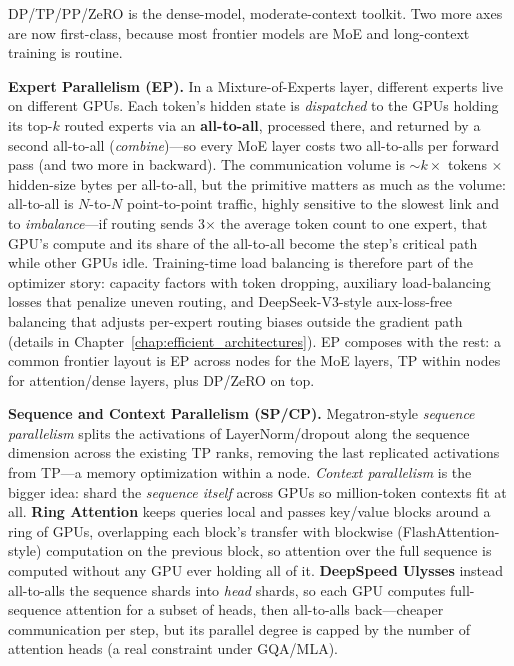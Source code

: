 DP/TP/PP/ZeRO is the dense-model, moderate-context toolkit. Two more axes are now first-class, because most frontier models are MoE and long-context training is routine.

\textbf{Expert Parallelism (EP).} In a Mixture-of-Experts layer, different experts live on different GPUs. Each token's hidden state is \emph{dispatched} to the GPUs holding its top-$k$ routed experts via an \textbf{all-to-all}, processed there, and returned by a second all-to-all (\emph{combine})---so every MoE layer costs two all-to-alls per forward pass (and two more in backward). The communication volume is $\sim k \times$ tokens $\times$ hidden-size bytes per all-to-all, but the primitive matters as much as the volume: all-to-all is $N$-to-$N$ point-to-point traffic, highly sensitive to the slowest link and to \emph{imbalance}---if routing sends 3$\times$ the average token count to one expert, that GPU's compute and its share of the all-to-all become the step's critical path while other GPUs idle. Training-time load balancing is therefore part of the optimizer story: capacity factors with token dropping, auxiliary load-balancing losses that penalize uneven routing, and DeepSeek-V3-style aux-loss-free balancing that adjusts per-expert routing biases outside the gradient path (details in Chapter~\ref{chap:efficient_architectures}). EP composes with the rest: a common frontier layout is EP across nodes for the MoE layers, TP within nodes for attention/dense layers, plus DP/ZeRO on top.

\textbf{Sequence and Context Parallelism (SP/CP).} Megatron-style \emph{sequence parallelism} splits the activations of LayerNorm/dropout along the sequence dimension across the existing TP ranks, removing the last replicated activations from TP---a memory optimization within a node. \emph{Context parallelism} is the bigger idea: shard the \emph{sequence itself} across GPUs so million-token contexts fit at all. \textbf{Ring Attention} keeps queries local and passes key/value blocks around a ring of GPUs, overlapping each block's transfer with blockwise (FlashAttention-style) computation on the previous block, so attention over the full sequence is computed without any GPU ever holding all of it. \textbf{DeepSpeed Ulysses} instead all-to-alls the sequence shards into \emph{head} shards, so each GPU computes full-sequence attention for a subset of heads, then all-to-alls back---cheaper communication per step, but its parallel degree is capped by the number of attention heads (a real constraint under GQA/MLA).

